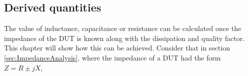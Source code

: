 \subsection{Derived quantities} \label{subsec:DerivedQuantities}
The value of inductance, capacitance or resistance can be calculated once the impedance of the DUT is known along with the dissipation and quality factor. This chapter will show how this can be achieved. Consider that in section \ref{sec:ImpedanceAnalysis}, where the impedance of a DUT had the form $Z = R \pm jX$,

